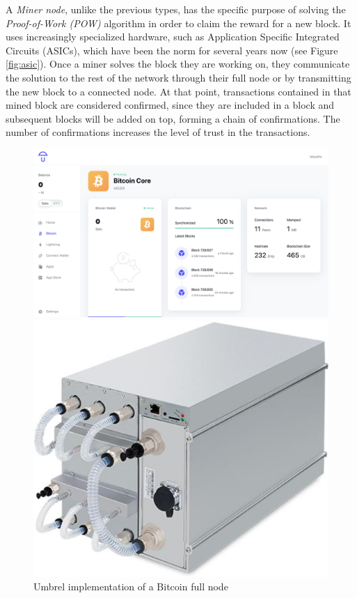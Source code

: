 A \textit{Miner node}, unlike the previous types, has the specific purpose of solving the \textit{Proof-of-Work (POW)} algorithm in order to claim the reward for a new block. It uses increasingly specialized hardware, such as Application Specific Integrated Circuits (ASICs), which have been the norm for several years now (see Figure \ref{fig:asic}). Once a miner solves the block they are working on, they communicate the solution to the rest of the network through their full node or by transmitting the new block to a connected node. At that point, transactions contained in that mined block are considered confirmed, since they are included in a block and subsequent blocks will be added on top, forming a chain of confirmations. The number of confirmations increases the level of trust in the transactions.

\begin{figure}[!ht]
    \begin{minipage}[t]{0.52\textwidth}
    \centering
    \includegraphics[width=1.1\textwidth]{Figures/bitcoin/bitpolito-node.png}
    \caption{Umbrel implementation of a Bitcoin full node}
    \label{fig:umbrel}
    \end{minipage}\hfill
    \begin{minipage}[t]{0.35\textwidth}
    \centering
    \includegraphics[width=1\textwidth]{Figures/bitcoin/s19xp.jpg}

\end{minipage}
\end{figure}

